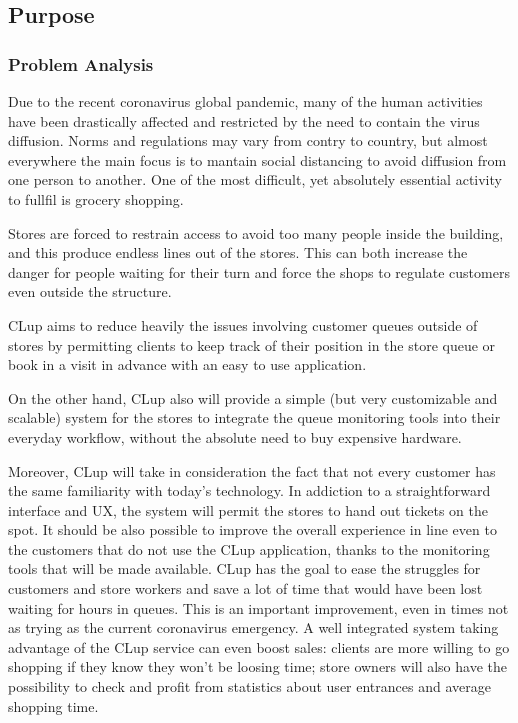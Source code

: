 \subsection{Purpose}

\subsubsection{Problem Analysis}

Due to the recent coronavirus global pandemic, many of the human activities have been drastically affected and restricted by the need to contain the virus diffusion.
Norms and regulations may vary from contry to country, but almost everywhere the main focus is to mantain social distancing to avoid diffusion from one person to another.
One of the most difficult, yet absolutely essential activity to fullfil is grocery shopping.

\medskip

Stores are forced to restrain access to avoid too many people inside the building,
and this produce endless lines out of the stores. This can both increase the danger for people waiting for their turn and force the shops to regulate customers even outside the structure.

\medskip

CLup aims to reduce heavily the issues involving customer queues outside of stores by permitting clients to keep track of their position in the store queue or book in a visit in advance with an easy to use application.

\medskip

On the other hand, CLup also will provide a simple (but very customizable and scalable) system for the stores to integrate the queue monitoring tools into their everyday workflow, without the absolute need to buy expensive hardware.

\medskip

Moreover, CLup will take in consideration the fact that not every customer has the same familiarity with today's technology.
In addiction to a straightforward interface and UX, the system will permit the stores to hand out tickets on the spot. It should be also possible to improve the overall experience in line even to the customers that do not use the CLup application, thanks to the monitoring tools that will be made available.
\medskip
CLup has the goal to ease the struggles for customers and store workers and save a lot of time that would have been lost waiting for hours in queues. This is an important improvement, even in times not as trying as the current coronavirus emergency.
A well integrated system taking advantage of the CLup service can even boost sales: clients are more willing to go shopping if they know they won't be loosing time; store owners will also have the possibility to check and profit from statistics about user entrances and average shopping time.

